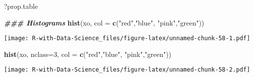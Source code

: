 \documentclass[
]{article}
\newenvironment{Shaded}{\begin{snugshade}}{\end{snugshade}}
\newcommand{\AttributeTok}[1]{\textcolor[rgb]{0.13,0.29,0.53}{#1}}
\newcommand{\DecValTok}[1]{\textcolor[rgb]{0.00,0.00,0.81}{#1}}
\newcommand{\DocumentationTok}[1]{\textcolor[rgb]{0.56,0.35,0.01}{\textbf{\textit{#1}}}}
\newcommand{\FunctionTok}[1]{\textcolor[rgb]{0.13,0.29,0.53}{\textbf{#1}}}
\newcommand{\NormalTok}[1]{#1}
\newcommand{\StringTok}[1]{\textcolor[rgb]{0.31,0.60,0.02}{#1}}
\begin{document}
\begin{Shaded}
\begin{Highlighting}[]
\NormalTok{?prop.table}

\DocumentationTok{\#\#\# Histograms}
\FunctionTok{hist}\NormalTok{(xo, }\AttributeTok{col =} \FunctionTok{c}\NormalTok{(}\StringTok{"red"}\NormalTok{,}\StringTok{"blue"}\NormalTok{, }\StringTok{"pink"}\NormalTok{,}\StringTok{"green"}\NormalTok{))}
\end{Highlighting}
\end{Shaded}

\texttt{[image: R-with-Data-Science\_files/figure-latex/unnamed-chunk-58-1.pdf]}

\begin{Shaded}
\begin{Highlighting}[]
\FunctionTok{hist}\NormalTok{(xo, }\AttributeTok{nclass=}\DecValTok{3}\NormalTok{, }\AttributeTok{col =} \FunctionTok{c}\NormalTok{(}\StringTok{"red"}\NormalTok{,}\StringTok{"blue"}\NormalTok{, }\StringTok{"pink"}\NormalTok{,}\StringTok{"green"}\NormalTok{))}
\end{Highlighting}
\end{Shaded}

\texttt{[image: R-with-Data-Science\_files/figure-latex/unnamed-chunk-58-2.pdf]}
\end{document}
